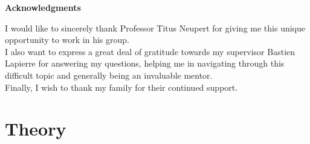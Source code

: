 \documentclass[11pt, a4paper, oneside]{book}
\theoremstyle{definition} %
\begin{document}

\tableofcontents


\pagebreak
\hspace{0pt}
\vfill
\begin{center}\textbf{Acknowledgments}
\end{center}

I would like to sincerely thank Professor Titus Neupert for giving me this unique opportunity to work in his group. \\

I also want to express a great deal of gratitude towards my supervisor Bastien Lapierre for answering my questions, helping me in navigating through this difficult topic and generally being an invaluable mentor.\\

Finally, I wish to thank my family for their continued support.
\vfill
\hspace{0pt}
\pagebreak


\chapter{Theory}
\end{document}
